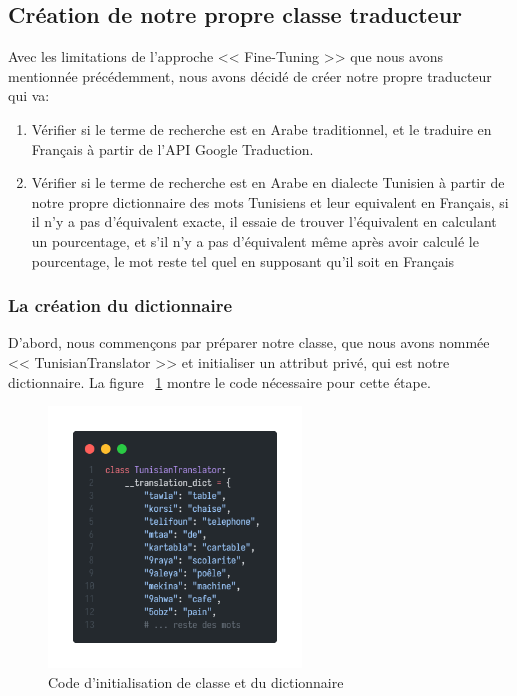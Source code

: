 \newpage
\subsection{Création de notre propre classe traducteur}
\noindent
Avec les limitations de l'approche << Fine-Tuning >> que nous avons mentionnée précédemment, nous avons décidé de créer notre propre traducteur qui va:
\begin{enumerate}
	\item Vérifier si le terme de recherche est en Arabe traditionnel, et le traduire en Français à partir de l'API Google Traduction.
	\item Vérifier si le terme de recherche est en Arabe en dialecte Tunisien à partir de notre propre dictionnaire des mots Tunisiens et leur equivalent en Français, si il n'y a pas d'équivalent exacte, il essaie de trouver l'équivalent en calculant un pourcentage, et s'il n'y a pas d'équivalent même après avoir calculé le pourcentage, le mot reste tel quel en supposant qu'il soit en Français
\end{enumerate}

\subsubsection{La création du dictionnaire}
\noindent
D'abord, nous commençons par préparer notre classe, que nous avons nommée << TunisianTranslator >> et initialiser un attribut privé, qui est notre dictionnaire. La figure ~\ref{fig:dictionary} montre le code nécessaire pour cette étape.

\begin{figure}[H]
	\centering
	\includegraphics[width=0.6\textwidth]{logos/dictionary.png}
	\caption{Code d'initialisation de classe et du dictionnaire}
	\label{fig:dictionary}
\end{figure}

